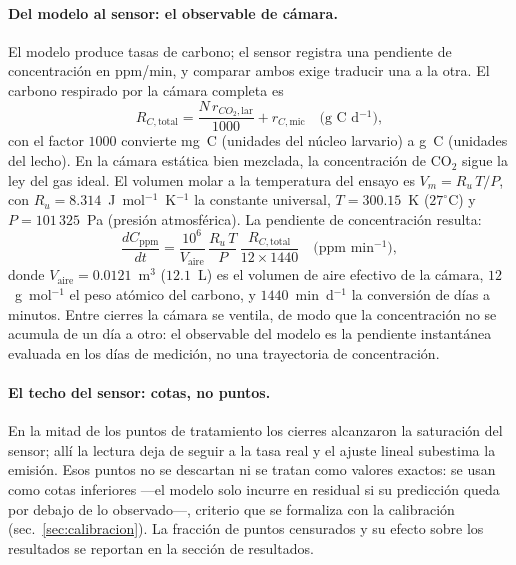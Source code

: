 \paragraph{Del modelo al sensor: el observable de c\'amara.}
El modelo produce tasas de carbono; el sensor registra una pendiente de concentraci\'on en ppm/min, y comparar ambos exige traducir una a la otra. El carbono respirado por la c\'amara completa es
\begin{equation}
  R_{C,\mathrm{total}} = \frac{N\,r_{CO_2,\mathrm{lar}}}{1000} + r_{C,\mathrm{mic}}
  \quad \text{(g~C~d$^{-1}$)},
  \label{eq:observable}
\end{equation}
con el factor $1000$ convierte mg~C (unidades del n\'ucleo larvario) a g~C (unidades del lecho). En la c\'amara est\'atica bien mezclada, la concentraci\'on de CO$_2$ sigue la ley del gas ideal. El volumen molar a la temperatura del ensayo es $V_m = R_u\,T/P$, con $R_u = 8.314$~J~mol$^{-1}$~K$^{-1}$ la constante universal, $T = 300.15$~K ($27^\circ$C) y $P = 101\,325$~Pa (presi\'on atmosf\'erica). La pendiente de concentraci\'on resulta:
\begin{equation}
  \frac{dC_{\mathrm{ppm}}}{dt} = \frac{10^{6}}{V_{\mathrm{aire}}}\,\frac{R_u\,T}{P}\,\frac{R_{C,\mathrm{total}}}{12 \times 1440}
  \quad \text{(ppm~min$^{-1}$)},
  \label{eq:gas-ideal}
\end{equation}
donde $V_{\mathrm{aire}} = 0.0121$~m$^3$ ($12.1$~L) es el volumen de aire efectivo de la c\'amara, $12$~g~mol$^{-1}$ el peso at\'omico del carbono, y $1440$~min~d$^{-1}$ la conversi\'on de d\'ias a minutos. Entre cierres la c\'amara se ventila, de modo que la concentraci\'on no se acumula de un d\'ia a otro: el observable del modelo es la pendiente instant\'anea evaluada en los d\'ias de medici\'on, no una trayectoria de concentraci\'on.

\paragraph{El techo del sensor: cotas, no puntos.}
En la mitad de los puntos de tratamiento los cierres alcanzaron la saturación del sensor; allí la lectura deja de seguir a la tasa real y el ajuste lineal subestima la emisión. Esos puntos no se descartan ni se tratan como valores exactos: se usan como cotas inferiores ---el modelo solo incurre en residual si su predicción queda por debajo de lo observado---, criterio que se formaliza con la calibración (sec.~\ref{sec:calibracion}). La fracción de puntos censurados y su efecto sobre los resultados se reportan en la sección de resultados.

